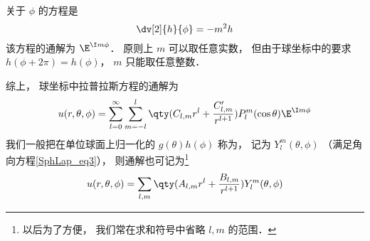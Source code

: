 关于 $\phi$ 的方程是
\begin{equation}
\dv[2]{h}{\phi} = -m^2 h
\end{equation}
该方程的通解为 $\E^{\I m\phi}$． 原则上 $m$ 可以取任意实数， 但由于球坐标中的要求 $h(\phi + 2\pi) = h(\phi)$， $m$ 只能取任意整数．

综上， 球坐标中拉普拉斯方程的通解为
\begin{equation}
u(r, \theta, \phi) = \sum_{l = 0}^\infty \sum_{m = -l}^l \qty(C_{l,m} r^l + \frac{C'_{l,m}}{r^{l+1}})P_l^m(\cos\theta)\E^{\I m\phi}
\end{equation}
我们一般把在单位球面上归一化的 $g(\theta)h(\phi)$ 称为， 记为 $Y_l^m(\theta,\phi)$ （满足角向方程\autoref{SphLap_eq3}）， 则通解也可记为\footnote{以后为了方便， 我们常在求和符号中省略 $l, m$ 的范围．}
\begin{equation}
u(r, \theta, \phi) = \sum_{l,m} \qty(A_{l,m} r^l + \frac{B_{l,m}}{r^{l+1}}) Y_l^m (\theta, \phi)
\end{equation}
